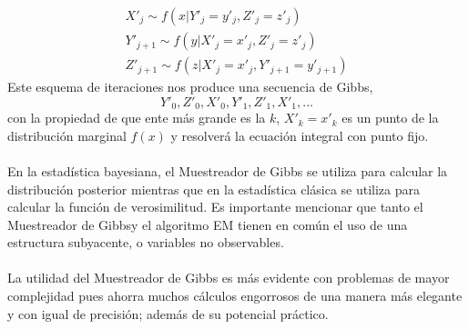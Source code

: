 \begin{align*}
X'_j \sim f(x|Y'_j = y'_j, Z'_j=z'_j)\\
Y'_{j+1} \sim f(y|X'_j=x'_j, Z'_j=z'_j)\\
Z'_{j+1} \sim f(z|X'_j=x'_j, Y'_{j+1}=y'_{j+1})
\end{align*}
Este esquema de iteraciones nos produce una secuencia de Gibbs,\\
\[Y'_0,Z'_0,X'_0,Y'_1,Z'_1,X'_1,...\]
con la propiedad de que ente m\'as grande es la $k$, $X'_k=x'_k$ es un punto de la distribuci\'on marginal $f(x)$ y resolver\'a la ecuaci\'on integral con punto fijo.\\
\\
En la estad\'istica bayesiana, el Muestreador de Gibbs se utiliza para calcular la distribuci\'on posterior mientras que en la estad\'istica cl\'asica se utiliza para calcular la funci\'on de verosimilitud. Es importante mencionar que tanto el Muestreador de Gibbsy el algoritmo EM tienen en com\'un el uso de una estructura subyacente, o variables no observables.\\
\\
La utilidad del Muestreador de Gibbs es m\'as evidente con problemas de mayor complejidad pues ahorra muchos c\'alculos engorrosos de una manera m\'as elegante y con igual de precisi\'on; adem\'as de su potencial pr\'actico.